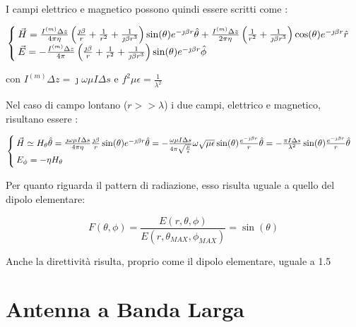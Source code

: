 I campi elettrico e magnetico possono quindi essere scritti come :

\begin{equation}
\begin{cases}
\vec{H} = \frac{I^{(m)} \Delta z}{4 \pi \eta} \left( \frac{\jmath \beta}{r} + \frac{1}{r^2} + \frac{1}{\jmath \beta r^3} \right) \sin (\theta) e^{-\jmath \beta r} \hat{\theta} + \frac{I^{(m)} \Delta z}{2 \pi \eta} \left(\frac{1}{r^2} + \frac{1}{\jmath \beta r^3} \right) \cos (\theta) e^{-\jmath \beta r} \hat{r} \\
\vec{E} = - \frac{I^{(m)} \Delta z}{4 \pi} \left( \frac{\jmath \beta}{r} + \frac{1}{r^2} + \frac{1}{\jmath \beta r^3} \right) \sin (\theta) e^{-\jmath \beta r} \hat{\phi} \end{cases}
\end{equation}


con $I^{(m)} \Delta z = \jmath \omega \mu I \Delta s$ e $f^2 \mu \epsilon = \frac{1}{\lambda^2}$

Nel caso di campo lontano ($r>>\lambda$) i due campi, elettrico e magnetico, risultano essere :

\begin{equation}
\begin{cases}
\vec{H} \simeq H_{\theta} \hat{\theta} = \frac{\jmath \omega \mu I \Delta s}{4 \pi \eta}	 \frac{\jmath \beta}{r} \sin (\theta) e^{-\jmath \beta r} \hat{\theta}	= -\frac{\omega \mu I \Delta s}{4 \pi \sqrt{\frac{\mu}{\epsilon}}}	\omega \sqrt{\mu \epsilon} \sin (\theta) \frac{e^{-\jmath \beta r}}{r} \hat{\theta} = -\frac{\pi I \Delta s}{\lambda^2} \sin (\theta) \frac{e^{-\jmath \beta r}}{r} \hat{\theta}	\\
E_{\phi} = - \eta H_{\theta} \end{cases}
\end{equation}

Per quanto riguarda il pattern di radiazione, esso risulta uguale a quello del dipolo elementare:

\begin{equation}
F(\theta, \phi) = \frac{E(r, \theta, \phi)}{E(r, \theta_{MAX}, \phi_{MAX})} = \sin(\theta)
\end{equation}

Anche la direttività risulta, proprio come il dipolo elementare, uguale a 1.5



\section{Antenna a Banda Larga}

